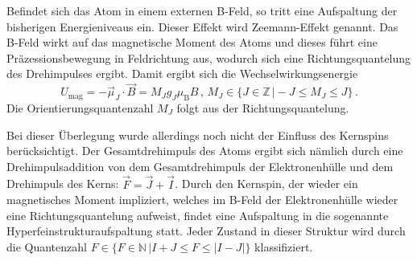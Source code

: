 Befindet sich das Atom in einem externen B-Feld, so tritt eine Aufspaltung der bisherigen 
Energieniveaus ein. Dieser Effekt wird Zeemann-Effekt genannt.
Das B-Feld wirkt auf das magnetische Moment des Atoms und dieses führt eine Präzessionsbewegung
in Feldrichtung aus, wodurch sich eine Richtungsquantelung des Drehimpulses ergibt. Damit 
ergibt sich die Wechselwirkungsenergie
\begin{equation}
	U_{\mathrm{mag}} = - \vec{\mu}_J \cdot \vec{B} = M_J g_J \mu_{\mathrm{B}} B \, \mathrm{,} \, M_J \in \{J \in \mathbb{Z} \, \vert -J \le M_J \le J\} \, \mathrm{.}
\end{equation}
Die Orientierungsquantenzahl $M_J$ folgt aus der Richtungsquantelung. 

Bei dieser Überlegung wurde allerdings noch nicht der Einfluss des Kernspins berücksichtigt.
Der Gesamtdrehimpuls des Atoms ergibt sich nämlich durch eine Drehimpulsaddition von dem 
Gesamtdrehimpuls der Elektronenhülle und dem Drehimpuls des Kerns: $\vec{F}=\vec{J}+\vec{I}$.
Durch den Kernspin, der wieder ein magnetisches Moment impliziert, welches im B-Feld der 
Elektronenhülle wieder eine Richtungsquantelung aufweist, findet eine Aufspaltung in die 
sogenannte Hyperfeinstrukturaufspaltung statt. Jeder Zustand in dieser Struktur wird durch
die Quantenzahl $F \in \{F \in \mathbb{N} \, \vert I+J \le F \le |I-J| \}$ klassifiziert.
